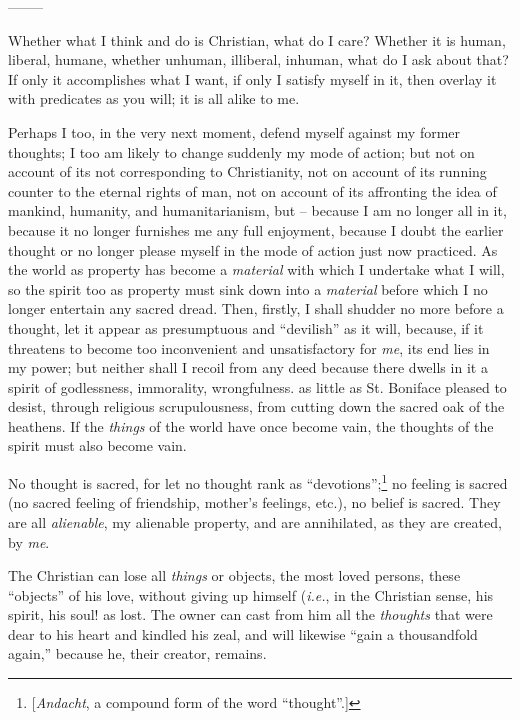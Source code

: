 \begin{center}
--------\end{center}


Whether what I think and do is Christian, what do I care? Whether it is human, 
liberal, humane, whether unhuman, illiberal, inhuman, what do I ask about 
that? If only it accomplishes what I want, if only I satisfy myself in it, 
then overlay it with predicates as you will; it is all alike to me.

Perhaps I too, in the very next moment, defend myself against my former 
thoughts; I too am likely to change suddenly my mode of action; but not on 
account of its not corresponding to Christianity, not on account of its 
running counter to the eternal rights of man, not on account of its affronting 
the idea of mankind, humanity, and humanitarianism, but -- because I am no 
longer all in it, because it no longer furnishes me any full enjoyment, 
because I doubt the earlier thought or no longer please myself in the mode of 
action just now practiced. As the world as property has become a 
\textit{material} with which I undertake what I will, so the spirit too as 
property must sink down into a \textit{material} before which I no longer 
entertain any sacred dread. Then, firstly, I shall shudder no more before a 
thought, let it appear as presumptuous and ``devilish'' as it will, because, 
if it threatens to become too inconvenient and unsatisfactory for \textit{me}, 
its end lies in my power; but neither shall I recoil from any deed because 
there dwells in it a spirit of godlessness, immorality, wrongfulness. as 
little as St. Boniface pleased to desist, through religious scrupulousness, 
from cutting down the sacred oak of the heathens. If the \textit{things} of 
the world have once become vain, the thoughts of the spirit must also become 
vain.

No thought is sacred, for let no thought rank as 
``devotions'';\footnote{[\textit{Andacht}, a compound form of the word 
``thought''.]} no feeling is sacred (no sacred feeling of friendship, 
mother's feelings, etc.), no belief is sacred. They are all 
\textit{alienable}, my alienable property, and are annihilated, as they are 
created, by \textit{me}.

The Christian can lose all \textit{things} or objects, the most loved persons, 
these ``objects'' of his love, without giving up himself (\textit{i.e.}, in 
the Christian sense, his spirit, his soul! as lost. The owner can cast from 
him all the \textit{thoughts} that were dear to his heart and kindled his 
zeal, and will likewise ``gain a thousandfold again,'' because he, their 
creator, remains.

